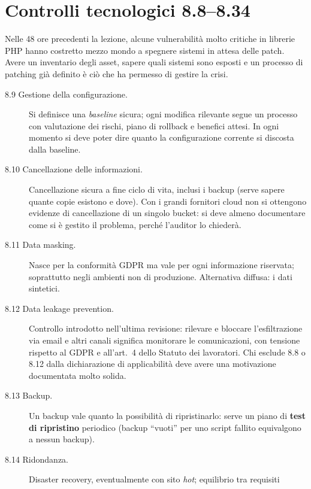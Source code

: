 \section{Controlli tecnologici 8.8--8.34}

\begin{nota}
Nelle 48 ore precedenti la lezione, alcune vulnerabilità molto critiche in librerie PHP hanno costretto
mezzo mondo a spegnere sistemi in attesa delle patch. Avere un inventario degli asset, sapere quali
sistemi sono esposti e un processo di patching già definito è ciò che ha permesso di gestire la crisi.
\end{nota}

\begin{description}
  \item[8.9 Gestione della configurazione.] Si definisce una \emph{baseline} sicura; ogni modifica
    rilevante segue un processo con valutazione dei rischi, piano di rollback e benefici attesi. In ogni
    momento si deve poter dire quanto la configurazione corrente si discosta dalla baseline.
  \item[8.10 Cancellazione delle informazioni.] Cancellazione sicura a fine ciclo di vita, inclusi i
    backup (serve sapere quante copie esistono e dove). Con i grandi fornitori cloud non si ottengono
    evidenze di cancellazione di un singolo bucket: si deve almeno documentare come si è gestito il
    problema, perché l'auditor lo chiederà.
  \item[8.11 Data masking.] Nasce per la conformità GDPR ma vale per ogni informazione riservata;
    soprattutto negli ambienti non di produzione. Alternativa diffusa: i dati sintetici.
  \item[8.12 Data leakage prevention.] Controllo introdotto nell'ultima revisione: rilevare e bloccare
    l'esfiltrazione via email e altri canali significa monitorare le comunicazioni, con tensione rispetto
    al GDPR e all'art.~4 dello Statuto dei lavoratori. Chi esclude 8.8 o 8.12 dalla dichiarazione di
    applicabilità deve avere una motivazione documentata molto solida.
  \item[8.13 Backup.] Un backup vale quanto la possibilità di ripristinarlo: serve un piano di
    \textbf{test di ripristino} periodico (backup ``vuoti'' per uno script fallito equivalgono a nessun
    backup).
  \item[8.14 Ridondanza.] Disaster recovery, eventualmente con sito \emph{hot}; equilibrio tra requisiti

\end{description}
